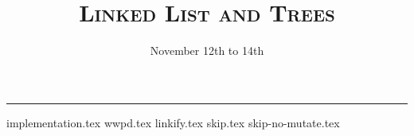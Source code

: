 \documentclass{exam}
\title{\textsc{Linked List and Trees}}
\date{November 12th to 14th}
\begin{document}
\maketitle
\rule{\textwidth}{0.15em}
\fontsize{12}{15}\selectfont


\begin{questions}
{implementation.tex}
{wwpd.tex}
\newpage
{linkify.tex}
{skip.tex}
{skip-no-mutate.tex}
\newpage

\end{questions}
\end{document}

